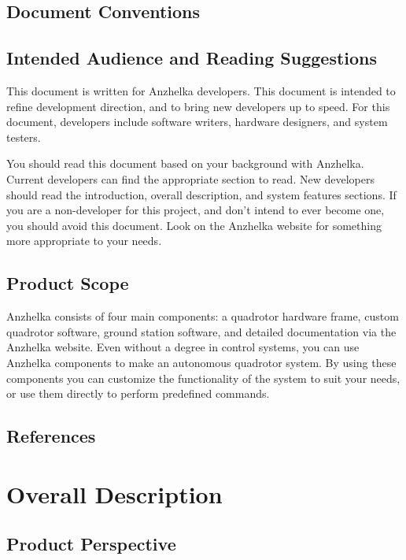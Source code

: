 \documentclass[english]{article}
\numberwithin{equation}{section} %
\begin{document}
\subsection{Document Conventions}
\subsection{Intended Audience and Reading Suggestions}
This document is written for Anzhelka developers. This document is intended to refine development direction, and to bring new developers up to speed. For this document, developers include software writers, hardware designers, and system testers.

You should read this document based on your background with Anzhelka. Current developers can find the appropriate section to read. New developers should read the introduction, overall description, and system features sections. If you are a non-developer for this project, and don't intend to ever become one, you should avoid this document. Look on the Anzhelka website for something more appropriate to your needs.


\subsection{Product Scope}
Anzhelka consists of four main components: a quadrotor hardware frame, custom quadrotor software, ground station software, and detailed documentation via the Anzhelka website. Even without a degree in control systems, you can use Anzhelka components to make an autonomous quadrotor system. By using these components you can customize the functionality of the system to suit your needs, or use them directly to perform predefined commands.


\subsection{References}

\newpage
\section{Overall Description}
\subsection{Product Perspective}
\end{document}
